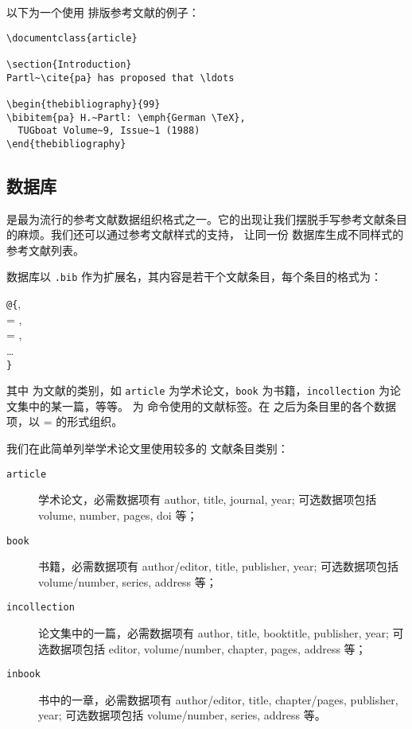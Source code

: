 以下为一个使用  排版参考文献的例子：

\begin{verbatim}
\documentclass{article}

\section{Introduction}
Partl~\cite{pa} has proposed that \ldots

\begin{thebibliography}{99}
\bibitem{pa} H.~Partl: \emph{German \TeX}, 
  TUGboat Volume~9, Issue~1 (1988)
\end{thebibliography}

\end{verbatim}

\subsection{ 数据库}\label{subsec:bibtex-data}

 是最为流行的参考文献数据组织格式之一。它的出现让我们摆脱手写参考文献条目的麻烦。我们还可以通过参考文献样式的支持，
让同一份  数据库生成不同样式的参考文献列表。

 数据库以 \texttt{.bib} 作为扩展名，其内容是若干个文献条目，每个条目的格式为：
\begin{command}
\texttt @\texttt\{, \\
\qquad{} = , \\
\qquad{} = , \\
\qquad\ldots\\
\texttt\}
\end{command}

其中  为文献的类别，如 \texttt{article} 为学术论文，\texttt{book} 为书籍，\texttt{in\-collection} 为论文集中的某一篇，等等。
 为  命令使用的文献标签。在  之后为条目里的各个数据项，以  =  的形式组织。

我们在此简单列举学术论文里使用较多的  文献条目类别：
\begin{description}
  \item[\texttt{article}] 学术论文，必需数据项有 author, title, journal, year; 可选数据项包括 volume, number, pages, doi 等；
  \item[\texttt{book}] 书籍，必需数据项有 author/editor, title, publisher, year; 可选数据项包括 volume/number, series, address 等；
  \item[\texttt{incollection}] 论文集中的一篇，必需数据项有 author, title, booktitle, publisher, year; 可选数据项包括 editor, volume/number, chapter, pages, address 等；
  \item[\texttt{inbook}] 书中的一章，必需数据项有 author/editor, title, chapter/pages, publisher, year; 可选数据项包括 volume/number, series, address 等。
\end{description}

